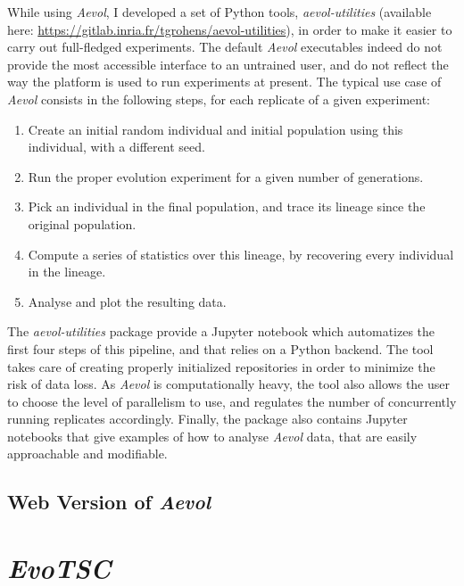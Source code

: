 While using \emph{Aevol}, I developed a set of Python tools, \emph{aevol-utilities} (available here: \url{https://gitlab.inria.fr/tgrohens/aevol-utilities}), in order to make it easier to carry out full-fledged experiments.
The default \emph{Aevol} executables indeed do not provide the most accessible interface to an untrained user, and do not reflect the way the platform is used to run experiments at present.
The typical use case of \emph{Aevol} consists in the following steps, for each replicate of a given experiment:
\begin{enumerate}
  \item Create an initial random individual and initial population using this individual, with a different seed.
  \item Run the proper evolution experiment for a given number of generations.
  \item Pick an individual in the final population, and trace its lineage since the original population.
  \item Compute a series of statistics over this lineage, by recovering every individual in the lineage.
  \item Analyse and plot the resulting data.
\end{enumerate}

The \emph{aevol-utilities} package provide a Jupyter notebook which automatizes the first four steps of this pipeline, and that relies on a Python backend.
The tool takes care of creating properly initialized repositories in order to minimize the risk of data loss.
As \emph{Aevol} is computationally heavy, the tool also allows the user to choose the level of parallelism to use, and regulates the number of concurrently running replicates accordingly.
Finally, the package also contains Jupyter notebooks that give examples of how to analyse \emph{Aevol} data, that are easily approachable and modifiable.

\subsection{Web Version of \emph{Aevol}}


\section{\emph{EvoTSC}}
